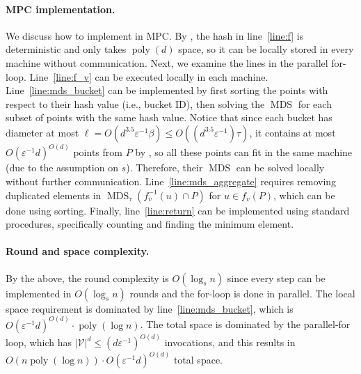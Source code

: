 \documentclass[11pt,letterpaper]{article}
\theoremstyle{plain}
\theoremstyle{definition}
\theoremstyle{remark}
\DeclareMathOperator{\poly}{poly}
\DeclareMathOperator{\MDS}{MDS}
\renewcommand{\epsilon}{\ensuremath{\varepsilon}}
\let\epsilon\varepsilon
\begin{document}
\paragraph{MPC implementation.}
We discuss how to implement  in MPC.
By , the hash in line~\ref{line:f} is deterministic and only takes $\poly(d)$ space,
so it can be locally stored in every machine without communication.
Next, we examine the lines in the parallel for-loop.
Line~\ref{line:f_v} can be executed locally in each machine.
Line~\ref{line:mds_bucket} can be implemented by first sorting the points with respect to their hash value (i.e., bucket ID),
then solving the $\MDS$ for each subset of points with the same hash value.
Notice that since each bucket has diameter at most $\ell = O(d^{3.5}\epsilon^{-1} \beta) \leq O((d^{3.5}\epsilon^{-1})\tau)$,
it contains at most $O(\varepsilon^{-1}d)^{O(d)}$ points from $P$ by , 
so all these points can fit in the same machine (due to the assumption on $s$).
Therefore, their $\MDS$ can be solved locally without further communication.
Line~\ref{line:mds_aggregate} requires removing duplicated elements in $\MDS_\tau(f_v^{-1}(u) \cap P)$ for $u \in f_v(P)$,
which can be done using sorting.
Finally, line~\ref{line:return} can be implemented using standard procedures, specifically counting and finding the minimum element.

\paragraph{Round and space complexity.}
By the above, the round complexity is $O(\log_s n)$ since every step can be implemented in $O(\log_s n)$ rounds and the for-loop is done in parallel.
The local space requirement is dominated by line~\ref{line:mds_bucket},
which is $O(\varepsilon^{-1}d)^{O(d)}\cdot \poly(\log n)$.
The total space is dominated by the parallel-for loop,
which has $|\mathcal{V}|^d \leq (d\epsilon^{-1})^{O(d)}$ invocations,
and this results in $O(n \poly(\log n)) \cdot O(\varepsilon^{-1}d)^{O(d)}$ total space.
\end{document}
